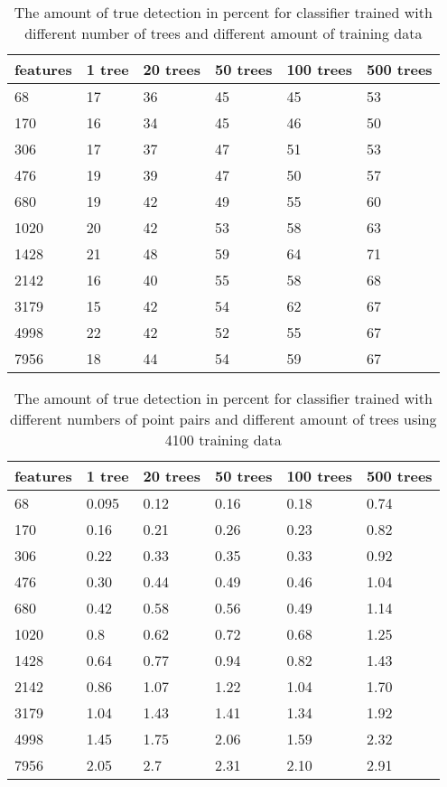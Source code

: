 \begin{table}[H]
\begin{center}
     \begin{tabular}{| l | l | l | l | l | l | }
     \hline
     features & 1 tree & 20 trees & 50 trees & 100 trees & 500 trees \\ \hline
     68 & 17 & 36 & 45 & 45 & 53 	\\ \hline
   	 170 & 16 & 34 & 45 & 46 & 50 	\\ \hline
     306 & 17 & 37 & 47  & 51  & 53	\\ \hline
     476 & 19 & 39 & 47 & 50 & 57	\\ \hline
     680 & 19 & 42 & 49 & 55 & 60	\\ \hline
	 1020 & 20 & 42 & 53 & 58 & 63	\\ \hline
	 1428 & 21 & 48 & 59 & 64 & 71	\\ \hline
	 2142 & 16 & 40 & 55 & 58 & 68	\\ \hline
	 3179 & 15 & 42 & 54 & 62 & 67	\\ \hline
	 4998 & 22 & 42 & 52 & 55 & 67	\\ \hline
	 7956 & 18 & 44 & 54 & 59 & 67	\\ \hline
     \end{tabular}
\end{center}
\caption{The amount of true detection in percent for classifier trained with different number of trees and different amount of training data}
\end{table}

\begin{table}[H]
\begin{center}
     \begin{tabular}{| l | l | l | l | l | l | }
     \hline
     features & 1 tree & 20 trees & 50 trees & 100 trees & 500 trees \\ \hline
     68 & 0.095 & 0.12 & 0.16 & 0.18 & 0.74	\\ \hline
   	 170 & 0.16 & 0.21 & 0.26 & 0.23 & 0.82 	\\ \hline
     306 & 0.22 & 0.33 & 0.35 & 0.33 & 0.92	\\ \hline
     476 & 0.30 & 0.44 & 0.49 & 0.46 & 1.04 	\\ \hline
     680 & 0.42 & 0.58 & 0.56 & 0.49 & 1.14	\\ \hline
	 1020 & 0.8 & 0.62 & 0.72 & 0.68 & 1.25	\\ \hline
	 1428 & 0.64 & 0.77 & 0.94 & 0.82 & 1.43	\\ \hline
	 2142 & 0.86 & 1.07 & 1.22 & 1.04 & 1.70	\\ \hline
	 3179 & 1.04 & 1.43 & 1.41 & 1.34 & 1.92	\\ \hline
	 4998 & 1.45 & 1.75 & 2.06 & 1.59 & 2.32	\\ \hline
	 7956 & 2.05 & 2.7 & 2.31 & 2.10 & 2.91	\\ \hline
     \end{tabular}
\end{center}
\caption{The amount of true detection in percent for classifier trained with different numbers of point pairs and different amount of trees using 4100 training data}
\end{table}

